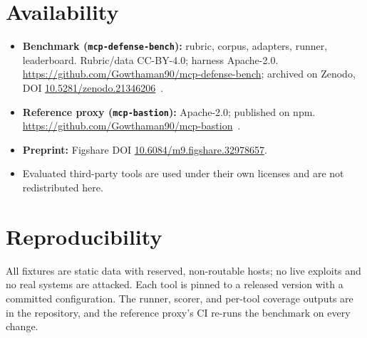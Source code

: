 \documentclass[11pt]{article}
\newcommand{\code}[1]{\texttt{\small #1}}
\begin{document}
\section*{Availability}
\label{sec:availability}
\begin{itemize}[leftmargin=1.4em,itemsep=1pt,topsep=2pt]
  \item \textbf{Benchmark (\code{mcp-defense-bench}):} rubric, corpus, adapters, runner, leaderboard. Rubric/data CC-BY-4.0; harness Apache-2.0. \url{https://github.com/Gowthaman90/mcp-defense-bench}; archived on Zenodo, DOI \href{https://doi.org/10.5281/zenodo.21346206}{10.5281/zenodo.21346206}~\citep{mcpdefensebench}.
  \item \textbf{Reference proxy (\code{mcp-bastion}):} Apache-2.0; published on npm. \url{https://github.com/Gowthaman90/mcp-bastion}~\citep{mcpbastion}.
  \item \textbf{Preprint:} Figshare DOI \href{https://doi.org/10.6084/m9.figshare.32978657}{10.6084/m9.figshare.32978657}.
  \item Evaluated third-party tools are used under their own licenses and are not redistributed here.
\end{itemize}

\section*{Reproducibility}
All fixtures are static data with reserved, non-routable hosts; no live exploits and no real systems are attacked. Each tool is pinned to a released version with a committed configuration. The runner, scorer, and per-tool coverage outputs are in the repository, and the reference proxy's CI re-runs the benchmark on every change.



\end{document}
